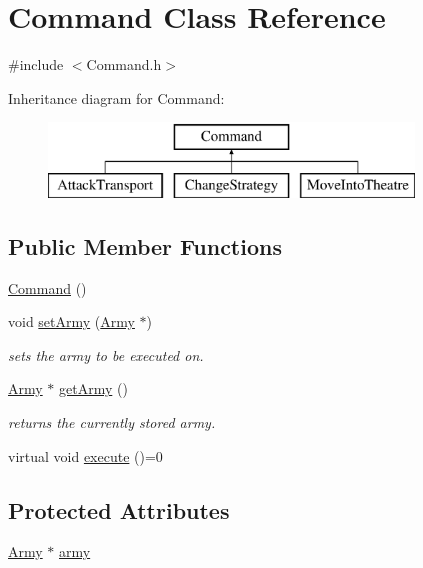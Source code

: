 \hypertarget{class_command}{}\section{Command Class Reference}
\label{class_command}


{\ttfamily \#include $<$Command.\+h$>$}

Inheritance diagram for Command\+:\begin{figure}[H]
\begin{center}
\leavevmode
\includegraphics[height=2.000000cm]{class_command}
\end{center}
\end{figure}
\subsection*{Public Member Functions}
\begin{DoxyCompactItemize}
\item 
\mbox{\hyperlink{class_command_a18df2d81039392daeb0b78c346a70537}{Command}} ()
\item 
void \mbox{\hyperlink{class_command_a4bc158ff4a08befd36846605a3c6d8bb}{set\+Army}} (\mbox{\hyperlink{class_army}{Army}} $\ast$)
\begin{DoxyCompactList}\small\item\em sets the army to be executed on. \end{DoxyCompactList}\item 
\mbox{\hyperlink{class_army}{Army}} $\ast$ \mbox{\hyperlink{class_command_a3e19da141499cf156f3a8ecbf2a168ce}{get\+Army}} ()
\begin{DoxyCompactList}\small\item\em returns the currently stored army. \end{DoxyCompactList}\item 
virtual void \mbox{\hyperlink{class_command_a6fd7d9bd8df8bfc881e4d6c7cd1878b7}{execute}} ()=0
\end{DoxyCompactItemize}
\subsection*{Protected Attributes}
\begin{DoxyCompactItemize}
\item 
\mbox{\hyperlink{class_army}{Army}} $\ast$ \mbox{\hyperlink{class_command_ae761c43165b07d7e120545f2d40cd79d}{army}}
\end{DoxyCompactItemize}


